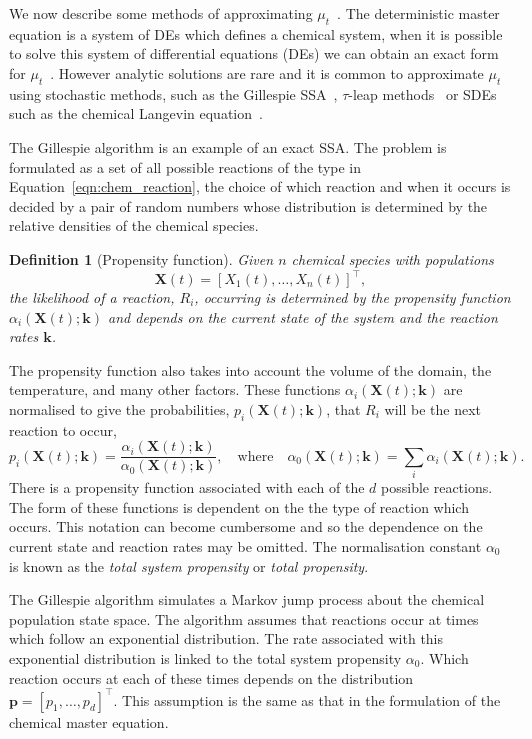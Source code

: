 \documentclass[final]{siamltex}
\newtheorem{dfn}{Definition}[section]
\begin{document}
We now describe some methods of approximating $\mu_t$~\cite{gillespie1991markov}. The deterministic master equation is a system of DEs which defines a chemical system, when it is possible to solve this system of differential equations (DEs) we can obtain an exact form for $\mu_t$~\cite{anderson2016product,jahnke2007solving,anderson2010product}. However analytic solutions are rare and it is common to approximate $\mu_t$ using stochastic methods, such as the Gillespie SSA~\cite{gillespie1977exact}, $\tau$-leap methods~\cite{cao2006efficient,cao2005avoiding,chatterjee2005binomial} or SDEs such as the chemical Langevin equation~\cite{gillespie2000chemical}.


The Gillespie algorithm is an example of an exact SSA. The problem is formulated as a set of all possible reactions of the type in Equation~\eqref{eqn:chem_reaction}, the choice of which reaction and when it occurs is decided by a pair of random numbers whose distribution is determined by the relative densities of the chemical species.

\begin{dfn}[Propensity function]
Given $n$ chemical species with populations
\[
	\mathbf{X}(t) = [X_1(t),\dots,X_n(t)]^\top,
\]
the likelihood of a reaction, $R_i$, occurring is determined by the \emph{propensity function} $\alpha_i(\mathbf{X}(t); \mathbf{k})$ and depends on the current state of the system and the reaction rates $\mathbf{k}$.
\end{dfn}

The propensity function also takes into account the volume of the domain, the temperature, and many other factors. These functions $\alpha_i(\mathbf{X}(t);\mathbf{k})$ are normalised to give the probabilities, $p_i(\mathbf{X}(t);\mathbf{k})$, that $R_i$ will be the next reaction to occur,
\[
	p_i(\mathbf{X}(t); \mathbf{k}) = \frac{\alpha_i(\mathbf{X}(t);\mathbf{k})}{\alpha_0(\mathbf{X}(t);\mathbf{k})}, \quad \text{where} \quad \alpha_0(\mathbf{X}(t);\mathbf{k}) = \sum_i \! \alpha_i(\mathbf{X}(t);\mathbf{k}).
\]
There is a propensity function associated with each of the $d$ possible reactions. The form of these functions is dependent on the the type of reaction which occurs. This notation can become cumbersome and so the dependence on the current state and reaction rates may be omitted. The normalisation constant $\alpha_0$ is known as the \emph{total system propensity} or \emph{total propensity}.

The Gillespie algorithm simulates a Markov jump process about the chemical population state space. The algorithm assumes that reactions occur at times which follow an exponential distribution. The rate associated with this exponential distribution is linked to the total system propensity $\alpha_0$. Which reaction occurs at each of these times depends on the distribution $\mathbf{p} = [p_1, \dots, p_d]^\top$. This assumption is the same as that in the formulation of the chemical master equation.
\end{document}
